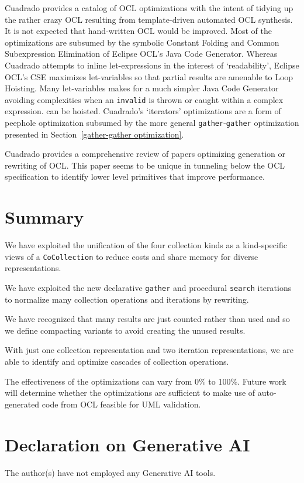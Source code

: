 \documentclass[
]{ceurart}
\begin{document}
Cuadrado \cite{cuadrado2020verified} provides a catalog of OCL optimizations with the intent of tidying up the rather crazy OCL resulting from template-driven automated OCL synthesis. It is not expected that hand-written OCL would be improved. Most of the optimizations are subsumed by the symbolic Constant Folding and Common Subexpression Elimination of Eclipse OCL's Java Code Generator. Whereas Cuadrado attempts to inline let-expressions in the interest of `readability', Eclipse OCL's CSE maximizes let-variables so that partial results are amenable to Loop Hoisting. Many let-variables makes for a much simpler Java Code Generator avoiding complexities when an \verb!invalid! is thrown or caught within a complex expression. can be hoisted. Cuadrado's `iterators' optimizations are a form of peephole optimization subsumed by the more general \verb!gather!-\verb!gather! optimization presented in Section~\ref{gather-gather optimization}.

Cuadrado provides a comprehensive review of papers optimizing generation or rewriting of OCL. This paper seems to be unique in tunneling below the OCL specification to identify lower level primitives that improve performance.

\section{Summary}\label{Summary}

We have exploited the unification of the four collection kinds as a kind-specific views of a \verb!CoCollection! to reduce costs and share memory for diverse representations.

We have exploited the new declarative \verb!gather! and procedural \verb!search! iterations to normalize many collection operations and iterations by rewriting.

We have recognized that many results are just counted rather than used and so we define compacting variants to avoid creating the unused results.

With just one collection representation and two iteration representations, we are able to identify and optimize cascades of collection operations.

The effectiveness of the optimizations can vary from 0\% to 100\%. Future work will determine whether the optimizations are sufficient to make use of auto-generated code from OCL feasible for UML validation.


\section*{Declaration on Generative AI}
  The author(s) have not employed any Generative AI tools.



\end{document}
